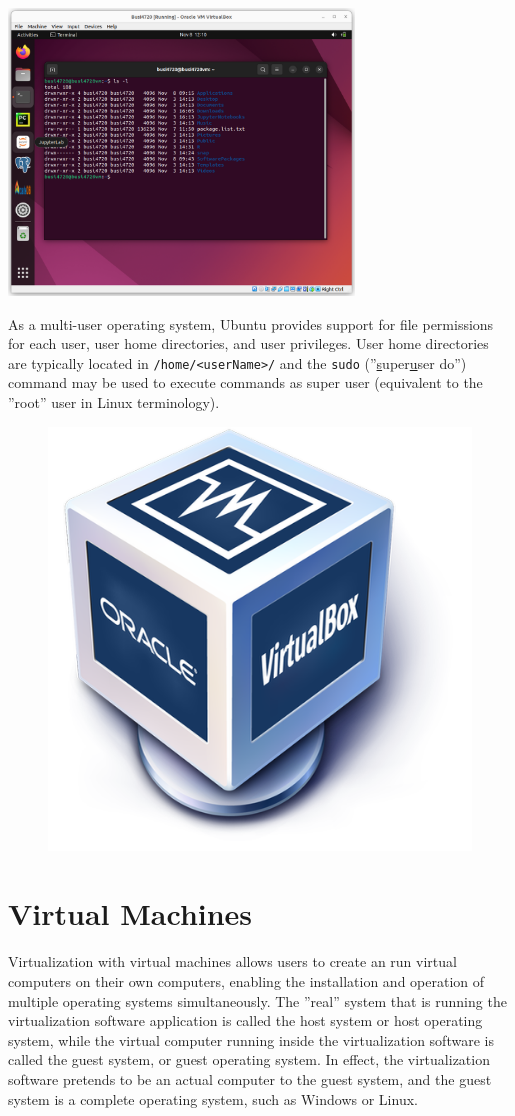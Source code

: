 \begin{center}
\includegraphics[height=3in]{screenshot1.png}
\end{center}

As a multi-user operating system, Ubuntu provides support for file permissions for each user, user home directories, and user privileges. User home directories are typically located in \texttt{/home/<userName>/} and the \texttt{sudo} (''\underline{s}uper\underline{u}ser do'') command may be used to execute commands as super user (equivalent to the ''root'' user in Linux terminology).
 
\begin{figure}
\begin{center}
\includegraphics[height=.5in]{Virtualbox_logo.png}
\end{center}
\end{figure}
 
\section{Virtual Machines}
 
Virtualization with virtual machines allows users to create an run virtual computers on their own computers, enabling the installation and operation of multiple operating systems simultaneously. The ''real'' system that is running the virtualization software application is called the host system or host operating system, while the virtual computer running inside the virtualization software is called the guest system, or guest operating system. In effect, the virtualization software pretends to be an actual computer to the guest system, and the guest system is a complete operating system, such as Windows or Linux.

